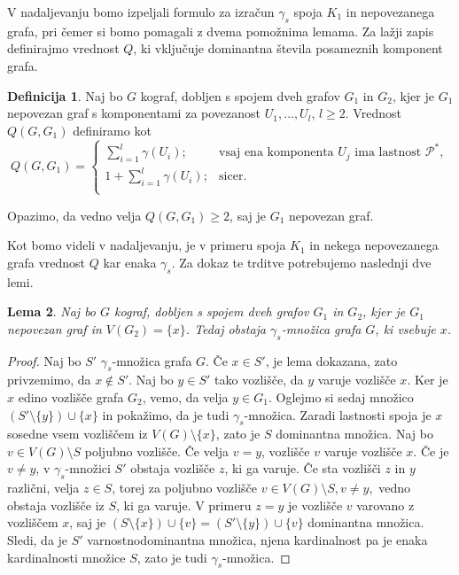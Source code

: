 \documentclass[12pt,a4paper,twoside]{article}
\theoremstyle{definition} %
\newtheorem{definicija}{Definicija}[section]
\theoremstyle{plain} %
\newtheorem{lema}[definicija]{Lema}
\numberwithin{equation}{section}  %
\begin{document}
V nadaljevanju bomo izpeljali formulo za izračun $\gamma_s$ spoja $K_1$ in nepovezanega grafa, pri čemer si bomo pomagali z dvema pomožnima lemama. Za lažji zapis definirajmo vrednost $Q$, ki vključuje dominantna števila posameznih komponent grafa.

\begin{definicija}Naj bo $G$ kograf, dobljen s spojem dveh grafov $G_1$ in $G_2$, kjer je $G_1$ nepovezan graf s komponentami za povezanost $U_1, \dots, U_l$, $l \geq 2$. Vrednost $Q(G, G_1)$ definiramo kot
$$Q(G, G_1) = 
  \begin{cases}
    \sum\limits_{i=1}^l \gamma(U_i); & \text{vsaj ena komponenta } U_j \text{ ima lastnost } \mathcal{P^*}, \\
    1 + \sum\limits_{i=1}^l \gamma(U_i); & \text{sicer. }\\
  \end{cases}
  $$
\end{definicija}
Opazimo, da vedno velja $Q(G, G_1) \geq 2$, saj je $G_1$ nepovezan graf.

Kot bomo videli v nadaljevanju, je v primeru spoja $K_1$ in nekega nepovezanega grafa vrednost $Q$ kar enaka $\gamma_s$. Za dokaz te trditve potrebujemo naslednji dve lemi.

\begin{lema}\label{Lema6}Naj bo $G$ kograf, dobljen s spojem dveh grafov $G_1$ in $G_2$, kjer je $G_1$ nepovezan graf in $V(G_2) = \{x\}$. Tedaj obstaja $\gamma_s$-množica grafa $G$, ki vsebuje $x$.
\end{lema}
\begin{proof}
Naj bo $S'$ $\gamma_s$-množica grafa $G$. Če $x \in S'$, je lema dokazana, zato privzemimo, da $x \not\in S'$. Naj bo $y\in S'$ tako vozlišče, da $y$ varuje vozlišče $x$. Ker je $x$ edino vozlišče grafa $G_2$, vemo, da velja $y \in G_1$. Oglejmo si sedaj množico $(S' \setminus \{y\}) \cup \{x\}$ in pokažimo, da je tudi $\gamma_s$-množica. Zaradi lastnosti spoja je $x$ sosedne vsem vozliščem iz $V(G) \setminus \{x\}$, zato je $S$ dominantna množica. Naj bo $v \in V(G) \setminus S$ poljubno vozlišče. Če velja $v=y$, vozlišče $v$ varuje vozlišče $x$. Če je $v \neq y$, v $\gamma_s$-množici $S'$ obstaja vozlišče $z$, ki ga varuje. Če sta vozlišči $z$ in $y$ različni, velja $z \in S$, torej za poljubno vozlišče $v \in V(G) \setminus S, v \neq y,$ vedno obstaja vozlišče iz $S$, ki ga varuje. V primeru $z = y$ je vozlišče $v$ varovano z vozliščem $x$, saj je $(S \setminus \{x\}) \cup \{v\} = (S' \setminus \{y\}) \cup \{v\}$ dominantna množica. Sledi, da je $S'$ varnostnodominantna množica, njena kardinalnost pa je enaka kardinalnosti množice $S$, zato je tudi $\gamma_s$-množica.
\end{proof}
\end{document}

